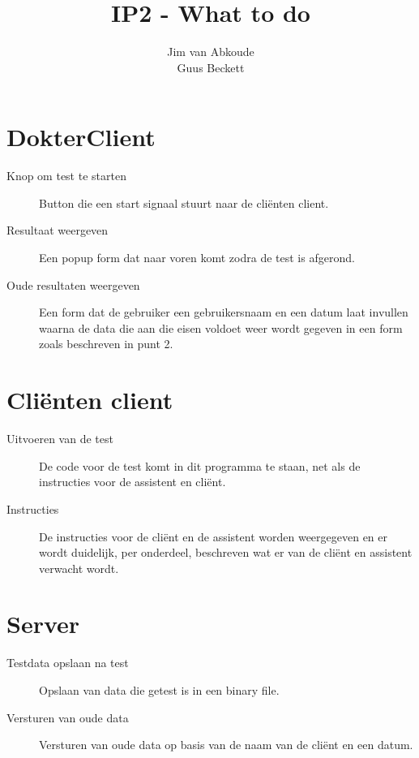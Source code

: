 \documentclass[10pt,a4paper,draft]{article}
\author{Jim van Abkoude \\ Guus Beckett}
\title{IP2 - What to do}
\begin{document}
\maketitle
\newpage
\section{DokterClient}

\begin{description}
\item[Knop om test te starten] Button die een start signaal stuurt naar de cli\"enten client.
\item[Resultaat weergeven] Een popup form dat naar voren komt zodra de test is afgerond.
\item[Oude resultaten weergeven] Een form dat de gebruiker een gebruikersnaam en een datum laat invullen waarna de data die aan die eisen voldoet weer wordt gegeven in een form zoals beschreven in punt 2.
\end{description}
\newpage
\section{Cli\"enten client}
\begin{description}
\item[Uitvoeren van de test] De code voor de test komt in dit programma te staan, net als de instructies voor de assistent en cli\"ent.
\item[Instructies] De instructies voor de cli\"ent en de assistent worden weergegeven en er wordt duidelijk, per onderdeel, beschreven wat er van de cli\"ent en assistent verwacht wordt.
\end{description}
\newpage
\section{Server}
\begin{description}
\item[Testdata opslaan na test] Opslaan van data die getest is in een binary file.
\item[Versturen van oude data] Versturen van oude data op basis van de naam van de cli\"ent en een datum. 
\end{description}
\newpage
\end{document}
